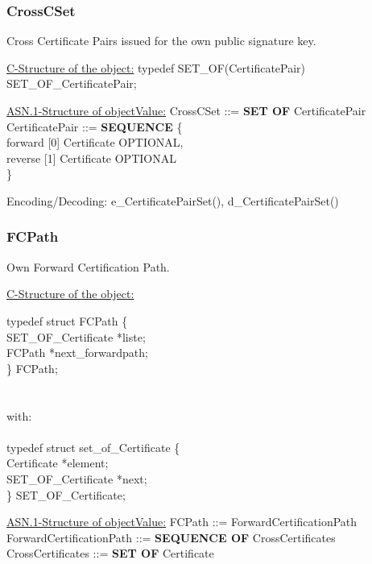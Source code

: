 \subsubsection{CrossCSet}
Cross Certificate Pairs issued for the own public signature key.

\underline{C-Structure of the object:} 
{\small
\bvtab
\4 typedef SET\_OF(CertificatePair)	SET\_OF\_CertificatePair;
\evtab
}


\underline{ASN.1-Structure of objectValue:}
{\small
\bvtab
\4        CrossCSet ::= {\bf SET OF} CertificatePair \\ [0.5cm]
\4        CertificatePair ::= \4 {\bf SEQUENCE} \{ \\
\9                 forward [0] Certificate OPTIONAL, \\
\9                 reverse [1] Certificate OPTIONAL  \\
\8 \}
\evtab
}

Encoding/Decoding: e\_CertificatePairSet(), d\_CertificatePairSet()

\subsubsection{FCPath}
Own Forward Certification Path. 

\underline{C-Structure of the object:}

{\small
\bvtab
\4      typedef struct FCPath \{  \\
\6              SET\_OF\_Certificate \4 *liste; \\
\6              FCPath               \4 *next\_forwardpath; \\
\4      \} FCPath;  \\ \\ \\
with: \\ \\
\4      typedef struct set\_of\_Certificate \{ \\
\6              Certificate          \4 *element; \\
\6              SET\_OF\_Certificate \4 *next; \\
\4      \} SET\_OF\_Certificate;  \\
\evtab
}


\underline{ASN.1-Structure of objectValue:}
{\small
\bvtab
\2 FCPath ::=                    \6 ForwardCertificationPath \\
\2 ForwardCertificationPath ::=  \6 {\bf SEQUENCE OF} CrossCertificates \\
\2 CrossCertificates ::=         \6 {\bf SET OF} Certificate
\evtab
}

